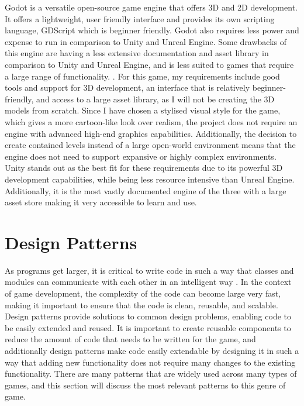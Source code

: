 \documentclass[10pt]{final_report}
\begin{document}
\newline
Godot is a versatile open-source game engine that offers 3D and 2D development. It offers a lightweight, user friendly interface and provides its own scripting language, GDScript which is beginner friendly. Godot also requires less power and expense to run in comparison to Unity and Unreal Engine. Some drawbacks of this engine are having a less extensive documentation and asset library in comparison to Unity and Unreal Engine, and is less suited to games that require a large range of functionality. \cite{hatton_2024}. \newline
For this game, my requirements include good tools and support for 3D development, an interface that is relatively beginner-friendly, and access to a large asset library, as I will not be creating the 3D models from scratch. Since I have chosen a stylised visual style for the game, which gives a more cartoon-like look over realism, the project does not require an engine with advanced high-end graphics capabilities. Additionally, the decision to create contained levels instead of a large open-world environment means that the engine does not need to support expansive or highly complex environments.
Unity stands out as the best fit for these requirements due to its powerful 3D development capabilities, while being less resource intensive than Unreal Engine. Additionally, it is the most vastly documented engine of the three with a large asset store making it very accessible to learn and use.


\section{Design Patterns}
As programs get larger, it is critical to write code in such a way that classes and modules can communicate with each other in an intelligent way \cite{Doran2017}. In the context of game development, the complexity of the code can become large very fast, making it important to ensure that the code is clean, reusable, and scalable. Design patterns provide solutions to common design problems, enabling code to be easily extended and reused. It is important to create reusable components to reduce the amount of code that needs to be written for the game, and additionally design patterns make code easily extendable by designing it in such a way that adding new functionality does not require many changes to the existing functionality. There are many patterns that are widely used across many types of games, and this section will discuss the most relevant patterns to this genre of game.
\end{document}

